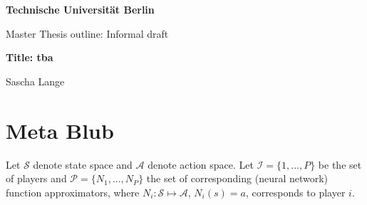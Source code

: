 \documentclass[a4paper, 11pt]{article}
\newcommand{\blatt}{}
\begin{document}
 
	
	\rhead[ \leftmark   ]{\textbf{}}
	\chead[\leftmark   ]{\leftmark{}}
	\lhead[\textbf{}]{\blatt}
	
	
	\thispagestyle{empty}
	\begin{center}
		
		\vspace*{1.4cm}
		{\LARGE \textbf{Technische Universität Berlin}}
		
		\vspace{0.5cm}
		
		{\large Master Thesis outline: Informal draft\\[1mm]}

		
		
		\vspace{1.0cm}
		{\LARGE \textbf{Title: tba}}\\
		\vspace*{1.0cm}
		
		
		Sascha Lange%
		
		
		
	\end{center}
	
	\renewcommand{\labelenumi}{\alph{enumi})}
	\renewcommand{\labelenumii}{(\roman{enumii})}
	\renewcommand{\labelenumiii}{\arabic{enumiii}.}
	\renewcommand{\contentsname}{Table of Contents}
	



	\newpage
	\newtheorem{Cor}{Corollary}
	\newtheorem{Theorem}{Theorem}
	\newtheorem{Def}{Definition}
	\newtheorem{Prop}{Proposition}
	\newtheorem{Lemma}{Lemma}
	\section*{Meta Blub}
	
	Let $\mathcal{S}$ denote state space and $\mathcal{A}$ denote action space. Let $\mathcal{I}=\{1,...,P\}$ be  the set of players and $\mathcal{P}=\{N_1,...,N_{P}\}$ the set of corresponding (neural network) function approximators, where $N_i : \mathcal{S} \mapsto \mathcal{A}$, $N_i(s) = a$, %
	corresponds to player $i$. \\
\end{document}
